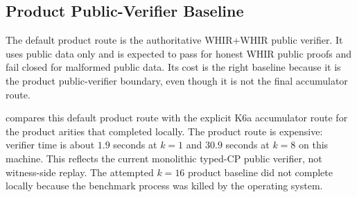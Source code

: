 \documentclass[11pt]{article}
\theoremstyle{definition}
\begin{document}
\subsection{Product Public-Verifier Baseline}
\label{sec:product-public-verifier-baseline}

The default product route is the authoritative WHIR+WHIR public verifier. It
uses public data only and is expected to pass for honest WHIR public proofs and
fail closed for malformed public data. Its cost is the right baseline because it
is the product public-verifier boundary, even though it is not the final
accumulator route.

 compares this default product route with the
explicit K6a accumulator route for the product arities that completed locally.
The product route is expensive: verifier time is about \(1.9\) seconds at
\(k=1\) and \(30.9\) seconds at \(k=8\) on this machine. This reflects the
current monolithic typed-CP public verifier, not witness-side replay. The
attempted \(k=16\) product baseline did not complete locally because the
benchmark process was killed by the operating system.

\begin{table}[H]
\centering
\small
{}
\caption{Default product public verifier compared with the explicit K6a
NonZK integrity accumulator route. Times and sizes are from
\texttt{benchmarks/product\_route\_comparison.csv}.}
\label{tab:product-k6a-comparison}
\end{table}
\end{document}
